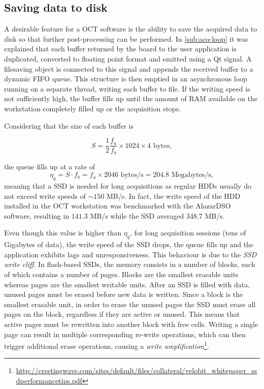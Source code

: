 \subsection{Saving data to disk}
A desirable feature for a OCT software is the ability to save the acquired data to disk so that further post-processing can be performed. In \autoref{sub:acq-loop} it was explained that each buffer returned by the board to the user application is duplicated, converted to floating point format and emitted using a Qt signal. A filesaving object is connected to this signal and appends the received buffer to a dynamic FIFO queue. This structure is then emptied in an asynchronous loop running on a separate thread, writing each buffer to file. If the writing speed is not sufficiently high, the buffer fills up until the amount of RAM available on the workstation completely filled up or the acquisition stops. 

Considering that the size of each buffer is

\begin{equation}
	S = \frac{1}{2} \frac{f_a}{f_b} \times 1024 \times 4 \text{ bytes},
\end{equation}

the queue fills up at a rate of
\begin{equation}
\eta_{q} = S \cdot f_b = f_a \times 2046\text{ bytes/s} = 204.8\text{ Megabytes/s},
\end{equation}
meaning that a \ac{SSD} is needed for long acquisitions as regular \acp{HDD} usually do not exceed write speeds of $\sim 150$ MB/s. In fact, the write speed of the HDD installed in the OCT workstation was benchmarked with the AlazarDSO software, resulting in $141.3$ MB/s while the SSD averaged $348.7$ MB/s. 

Even though this value is higher than $\eta_q$, for long acquisition sessions (tens of Gigabytes of data), the write speed of the SSD drops, the queue fills up and the application exhibits lags and unresponsiveness. This behaviour is due to the \emph{SSD write cliff}. In flash-based SSDs, the memory consists in a number of blocks, each of which contains a number of pages. Blocks are the smallest erasable units whereas pages are the smallest writable units. After an SSD is filled with data, unused pages must be erased before new data is written. Since a block is the smallest erasable unit, in order to erase the unused pages the SSD must erase all pages on the block, regardless if they are active or unused. This means that active pages must be rewritten into another block with free cells. Writing a single page can result in multiple corresponding re-write operations, which can then trigger additional erase operations, causing a \emph{write amplification}\footnote{\url{http://crestingwave.com/sites/default/files/collateral/velobit_whitepaper_ssdperformancetips.pdf}}. 

